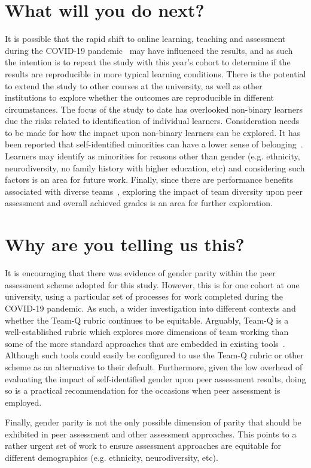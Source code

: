 \documentclass[sigconf, anonymous=false]{acmart}
\begin{document}
\section{What will you do next?}
It is possible that the rapid shift to online learning, teaching and
assessment during the COVID-19 pandemic~\cite{crick-et-al:ukicer2020}
may have influenced the results, and as such the intention is to
repeat the study with this year's cohort to determine if the results
are reproducible in more typical learning conditions. There is the
potential to extend the study to other courses at the university, as
well as other institutions to explore whether the outcomes are
reproducible in different circumstances. The focus of the study to
date has overlooked non-binary learners due the risks related to
identification of individual learners. Consideration needs to be made
for how the impact upon non-binary learners can be explored. It has
been reported that self-identified minorities can have a lower sense
of belonging~\cite{Mooney2020}. Learners may identify as minorities
for reasons other than gender (e.g. ethnicity, neurodiversity, no
family history with higher education, etc) and considering such
factors is an area for future work. Finally, since there are
performance benefits associated with diverse teams~\cite{HBR206},
exploring the impact of team diversity upon peer assessment and
overall achieved grades is an area for further exploration.


\section{Why are you telling us this?}
It is encouraging that there was evidence of gender parity within the
peer assessment scheme adopted for this study. However, this is for
one cohort at one university, using a particular set of processes for
work completed during the COVID-19 pandemic. As such, a wider
investigation into different contexts and whether the Team-Q rubric
continues to be equitable. Arguably, Team-Q is a well-established
rubric which explores more dimensions of team working than some of the
more standard approaches that are embedded in existing
tools~\cite{WebPA,BuddyCheck,SparkPlus}. Although such tools could
easily be configured to use the Team-Q rubric or other scheme as an
alternative to their default. Furthermore, given the low overhead of
evaluating the impact of self-identified gender upon peer assessment
results, doing so is a practical recommendation for the occasions when
peer assessment is employed.

Finally, gender parity is not the only possible dimension of parity
that should be exhibited in peer assessment and other assessment
approaches. This points to a rather urgent set of work to ensure
assessment approaches are equitable for different demographics
(e.g. ethnicity, neurodiversity, etc).


\end{document}
